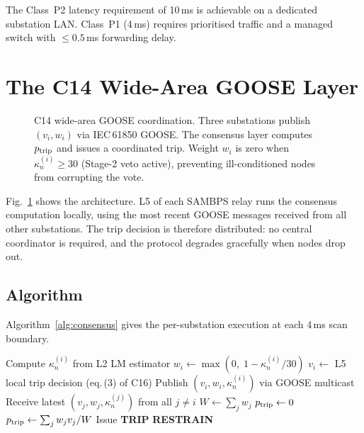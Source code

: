 \documentclass[journal]{IEEEtran}
\newcommand{\kappan}{\kappa_{n}}
\newcommand{\ptrip}{p_{\rm trip}}
\begin{document}
The Class~P2 latency requirement of 10\,ms is achievable on a
dedicated substation LAN.  Class~P1 (4\,ms) requires prioritised
traffic and a managed switch with $\leq 0.5$\,ms forwarding delay.

\section{The C14 Wide-Area GOOSE Layer}
\label{sec:c14}

\begin{figure}[!t]
\centering
\resizebox{\columnwidth}{!}{%
%
}
\caption{C14 wide-area GOOSE coordination.  Three substations
  publish $(v_i, w_i)$ via IEC\,61850 GOOSE.  The consensus layer
  computes $\ptrip$ and issues a coordinated trip.  Weight $w_i$
  is zero when $\kappan^{(i)} \geq 30$ (Stage-2 veto active),
  preventing ill-conditioned nodes from corrupting the vote.}
\label{fig:goose_architecture}
\end{figure}

Fig.~\ref{fig:goose_architecture} shows the architecture.  L5 of
each SAMBPS relay runs the consensus computation locally, using
the most recent GOOSE messages received from all other substations.
The trip decision is therefore distributed: no central coordinator
is required, and the protocol degrades gracefully when nodes drop
out.

\subsection{Algorithm}

Algorithm~\ref{alg:consensus} gives the per-substation execution at
each 4\,ms scan boundary.

\begin{algorithm}[!t]
\caption{C14 Wide-Area Consensus (per substation $i$, each scan)}
\label{alg:consensus}
\begin{algorithmic}[1]
\State Compute $\kappan^{(i)}$ from L2 LM estimator
\State $w_i \leftarrow \max(0,\; 1 - \kappan^{(i)}/30)$
\State $v_i \leftarrow$ L5 local trip decision (eq.\,(3) of C16)
\State Publish $(v_i, w_i, \kappan^{(i)})$ via GOOSE multicast
\State Receive latest $(v_j, w_j, \kappan^{(j)})$ from all $j \neq i$
\State $W \leftarrow \sum_{j} w_j$
  \State $\ptrip \leftarrow 0$ 
\Else
  \State $\ptrip \leftarrow \sum_j w_j v_j / W$
\EndIf
\If{$\ptrip > 0.5$ \textbf{and} $w_i > 0$}
  \State Issue \textbf{TRIP}
\Else
  \State \textbf{RESTRAIN}
\EndIf
\end{algorithmic}
\end{algorithm}
\end{document}
